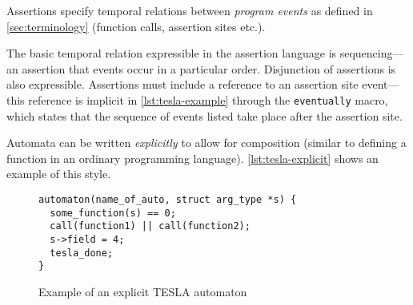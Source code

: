 Assertions specify temporal relations between \emph{program events} as defined
in \autoref{sec:terminology} (function calls, assertion sites etc.).

The basic temporal relation expressible in the assertion language is
sequencing---an assertion that events occur in a particular order. Disjunction
of assertions is also expressible. Assertions must include a reference to an
assertion site event---this reference is implicit in \autoref{lst:tesla-example}
through the \texttt{eventually} macro, which states that the sequence of
events listed take place after the assertion site.

Automata can be written \emph{explicitly} to allow for composition (similar to
defining a function in an ordinary programming language).
\autoref{lst:tesla-explicit} shows an example of this style.

\begin{figure}
  \begin{verbatim}
automaton(name_of_auto, struct arg_type *s) {
  some_function(s) == 0;
  call(function1) || call(function2);
  s->field = 4;
  tesla_done;
}
  \end{verbatim}
  \caption{Example of an explicit TESLA automaton}
  \label{lst:tesla-explicit}
\end{figure}
